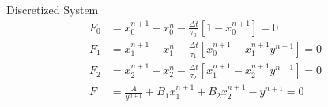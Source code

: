 \begin{block}{Discretized System}
\begin{align*}
F_0 &= x_0^{n+1} - x_0^n - \frac{\Delta t}{\tau_0}[1 - x_0^{n+1}] = 0 \\[0.2cm]
F_1 &= x_1^{n+1} - x_1^n - \frac{\Delta t}{\tau_1}[x_0^{n+1} - x_1^{n+1} y^{n+1}] = 0 \\[0.2cm]
F_2 &= x_2^{n+1} - x_2^n - \frac{\Delta t}{\tau_2}[x_1^{n+1} - x_2^{n+1} y^{n+1}] = 0 \\[0.2cm]
F &= \frac{A}{y^{n+1}} + B_1 x_1^{n+1} + B_2 x_2^{n+1} - y^{n+1} = 0
\end{align*}
\end{block}
